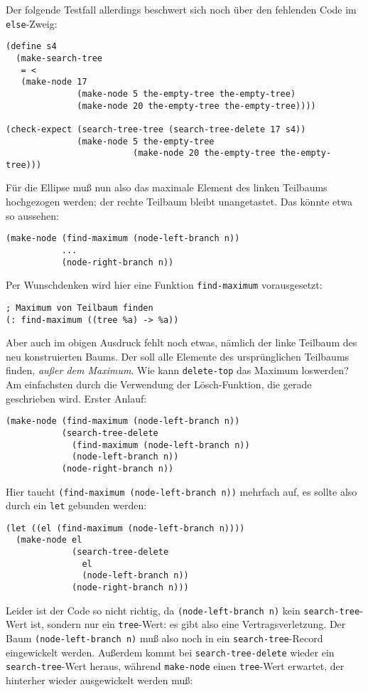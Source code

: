 Der folgende Testfall allerdings beschwert sich noch über den
fehlenden Code im \texttt{else}-Zweig:
%
\begin{verbatim}
(define s4
  (make-search-tree
   = <
   (make-node 17
              (make-node 5 the-empty-tree the-empty-tree)
              (make-node 20 the-empty-tree the-empty-tree))))

(check-expect (search-tree-tree (search-tree-delete 17 s4))
              (make-node 5 the-empty-tree
                         (make-node 20 the-empty-tree the-empty-tree)))
\end{verbatim}
%
Für die Ellipse muß nun also das maximale Element des linken Teilbaums
hochgezogen werden; der rechte Teilbaum bleibt unangetastet.  Das
könnte etwa so aussehen:
%
\begin{verbatim}
(make-node (find-maximum (node-left-branch n))
           ...
           (node-right-branch n))
\end{verbatim}
%
Per Wunschdenken wird hier eine Funktion \texttt{find-maximum}
vorausgesetzt:
%
\begin{verbatim}
; Maximum von Teilbaum finden
(: find-maximum ((tree %a) -> %a))
\end{verbatim}
%
Aber auch im obigen Ausdruck fehlt noch etwas, nämlich der linke
Teilbaum des neu konstruierten Baums.  Der soll alle Elemente des
ursprünglichen Teilbaums finden, \emph{außer dem Maximum}.  Wie kann
\texttt{delete-top} das Maximum loswerden?  Am einfachsten durch die
Verwendung der Lösch-Funktion, die gerade geschrieben wird.  Erster
Anlauf:
%
\begin{verbatim}
(make-node (find-maximum (node-left-branch n))
           (search-tree-delete
             (find-maximum (node-left-branch n))
             (node-left-branch n))
           (node-right-branch n))
\end{verbatim}
%
Hier taucht \texttt{(find-maximum (node-left-branch n))} mehrfach auf,
es sollte also durch ein \texttt{let} gebunden werden:
%
\begin{verbatim}
(let ((el (find-maximum (node-left-branch n))))
  (make-node el
             (search-tree-delete
               el
               (node-left-branch n))
             (node-right-branch n)))
\end{verbatim}
%
Leider ist der Code so nicht richtig, da \texttt{(node-left-branch n)}
kein \texttt{search-tree}-Wert ist, sondern nur ein
\texttt{tree}-Wert: es gibt also eine Vertragsverletzung.  Der Baum
\texttt{(node-left-branch n)} muß also noch in ein
\texttt{search-tree}-Record eingewickelt werden.  Außerdem kommt bei
\texttt{search-tree-delete} wieder ein \texttt{search-tree}-Wert
heraus, während \texttt{make-node} einen \texttt{tree}-Wert erwartet,
der hinterher wieder ausgewickelt werden muß:
%

